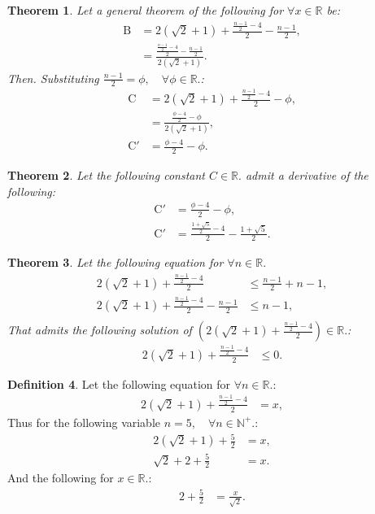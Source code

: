 \documentclass[10pt]{article}
\theoremstyle{plain}
\newtheorem{theorem}{Theorem}[section]
\theoremstyle{definition}
\newtheorem{definition}[theorem]{Definition}
\theoremstyle{remark}
\begin{document}
\begin{theorem}
	Let a general theorem of the following for $\forall x \in \mathbb{R}$ be:
	\begin{align*}
		\mathrm{B} &= 2(\sqrt{2} + 1) + \frac{\frac{n - 1}{2} - 4}{2} - \frac{n - 1}{2},\\
		&= \frac{\frac{\frac{n - 1}{2} - 4}{2} - \frac{n - 1}{2}}{2(\sqrt{2} + 1)}.
	\end{align*}
	Then. Substituting $\frac{n - 1}{2}=\phi, \quad \forall \phi \in \mathbb{R}.$:
	\begin{align*}
		\mathrm{C} &= 2(\sqrt{2} + 1) + \frac{\frac{n - 1}{2} - 4}{2} - \phi,\\
		&= \frac{\frac{\phi - 4}{2} - \phi}{2(\sqrt{2} + 1)},\\
		\mathrm{C}' &= \frac{\phi - 4}{2} - \phi.
	\end{align*}
\end{theorem}

\begin{theorem}
	Let the following constant $C \in \mathbb{R}.$ admit a derivative of the following:
	\begin{align*}
		\mathrm{C}' &= \frac{\phi - 4}{2} - \phi,\\
		\mathrm{C}' &= \frac{\frac{1+\sqrt{5}}{2} - 4}{2} - \frac{1+\sqrt{5}}{2}.
	\end{align*}
\end{theorem}

\begin{theorem}
	Let the following equation for $\forall n \in \mathbb{R}.$
	\begin{align*}
		2(\sqrt{2} + 1) + \frac{\frac{n - 1}{2} - 4}{2}  &\leq \frac{n - 1}{2} + n - 1,\\
		2(\sqrt{2} + 1) + \frac{\frac{n - 1}{2} - 4}{2} - \frac{n - 1}{2} &\leq n - 1,\\
	\end{align*}
	 That admits the following solution of $(2(\sqrt{2} + 1) + \frac{\frac{n - 1}{2} - 4}{2}) \in \mathbb{R}.$:
	\begin{align*}
	 	2(\sqrt{2} + 1) + \frac{\frac{n - 1}{2} - 4}{2} &\leq 0.
	\end{align*}
\end{theorem}

\begin{definition}
	Let the following equation for $\forall n \in \mathbb{R}.$:
	\begin{align*}
		2(\sqrt{2} + 1) + \frac{\frac{n - 1}{2} - 4}{2} &= x,
	\end{align*}
	Thus for the following variable $n=5, \quad \forall n \in \mathbb{N}^{+}.$:
	\begin{align*}
		2(\sqrt{2} + 1) + \frac{5}{2} &= x,\\
		\sqrt{2}+2 + \frac{5}{2} &= x.
	\end{align*}
	And the following for $x \in \mathbb{R}.$:
	\begin{align*}
		2+\frac{5}{2} &= \frac{x}{\sqrt{2}}.
	\end{align*}
\end{definition}
\end{document}

